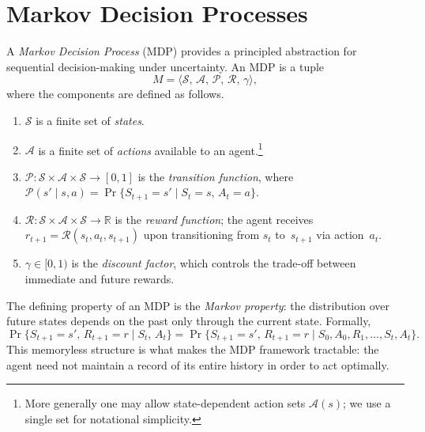\documentclass[a4paper,oneside,11pt]{report}
\begin{document}
\section{Markov Decision Processes}
\label{sec:mdp}

A \emph{Markov Decision Process} (MDP) provides a principled abstraction for sequential decision-making under uncertainty. An MDP is a tuple
\begin{equation}\label{eq:mdp-tuple}
  M = \langle \mathcal{S},\, \mathcal{A},\, \mathcal{P},\, \mathcal{R},\, \gamma \rangle,
\end{equation}
where the components are defined as follows.

\begin{definition}\label{def:mdp}

\begin{enumerate}[label=(\roman*)]
  \item $\mathcal{S}$ is a finite set of \emph{states}.
  \item $\mathcal{A}$ is a finite set of \emph{actions} available to an agent.\footnote{More generally one may allow state-dependent action sets $\mathcal{A}(s)$; we use a single set for notational simplicity.}
  \item $\mathcal{P}\colon \mathcal{S}\times\mathcal{A}\times\mathcal{S} \to [0,1]$ is the \emph{transition function}, where $\mathcal{P}(s'\mid s,a) = \Pr\{S_{t+1}=s' \mid S_t=s,\,A_t=a\}$.
  \item $\mathcal{R}\colon \mathcal{S}\times\mathcal{A}\times\mathcal{S} \to \mathbb{R}$ is the \emph{reward function}; the agent receives $r_{t+1} = \mathcal{R}(s_t,a_t,s_{t+1})$ upon transitioning from $s_t$ to~$s_{t+1}$ via action~$a_t$.
  \item $\gamma \in [0,1)$ is the \emph{discount factor}, which controls the trade-off between immediate and future rewards.
\end{enumerate}
\end{definition}

The defining property of an MDP is the \emph{Markov property}: the distribution over future states depends on the past only through the current state. Formally,
\begin{equation}\label{eq:markov-property}
  \Pr\{S_{t+1}=s',\, R_{t+1}=r \mid S_t,\,A_t\} = \Pr\{S_{t+1}=s',\, R_{t+1}=r \mid S_0,A_0,R_1,\ldots,S_t,A_t\}.
\end{equation}
This memoryless structure is what makes the MDP framework tractable: the agent need not maintain a record of its entire history in order to act optimally.
\end{document}
